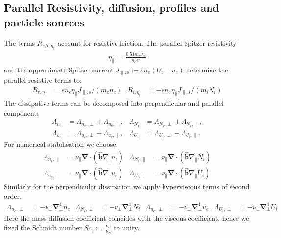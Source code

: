 \documentclass{hitec} %
\renewcommand{\vec}[1]{\boldsymbol{#1}}
\begin{document}
\subsection{Parallel Resistivity, diffusion, profiles and particle sources}\label{sec:dissres}
The terms $R_{e/i,\eta_\parallel}$ account for resistive friction.
The parallel Spitzer resistivity
\begin{align}
\eta_\parallel := \frac{0.51 m_e \nu_{ei}}{n_e e^2}
\end{align}
and the approximate Spitzer current \(J_{\parallel,s}:= e n_e \left(U_i - u_e\right)\) determine the parallel resistive terms to:
\begin{align}
  R_{e,\eta_\parallel} &=  en_e\eta_\parallel J_{\parallel,s}/(m_en_e)  &
  R_{i,\eta_\parallel} &=- en_e\eta_\parallel J_{\parallel,s}/(m_iN_i)
\end{align}
The dissipative terms can be decomposed into perpendicular and parallel components
\begin{align}
 \Lambda_{n_e} &= \Lambda_{n_e,\perp}+\Lambda_{n_e,\parallel}, &
 \Lambda_{N_i} &= \Lambda_{N_i,\perp}+\Lambda_{N_i,\parallel},\\
 \Lambda_{u_e} &= \Lambda_{u_e,\perp}+\Lambda_{u_e,\parallel},&
 \Lambda_{U_i} &= \Lambda_{U_i,\perp}+\Lambda_{U_i,\parallel}.
\end{align}
For numerical stabilisation we choose:
\begin{align}
\Lambda_{n_e,\parallel} &=  \nu_\parallel\vec{\nabla} \cdot \left(\vec{\hat{b}} \nabla_\parallel n_e\right) &
 \Lambda_{N_i,\parallel} &=  \nu_\parallel\vec{\nabla} \cdot \left(\vec{\hat{b}} \nabla_\parallel N_i\right) \\
  \Lambda_{u_e,\parallel} &= \nu_\parallel \vec{\nabla} \cdot \left(\vec{\hat{b}} \nabla_\parallel u_e\right) &
 \Lambda_{U_i,\parallel} &= \nu_\parallel \vec{\nabla} \cdot \left(\vec{\hat{b}} \nabla_\parallel U_i\right) 
\end{align}
Similarly for the perpendicular dissipation we apply hyperviscous terms of second order.
\begin{align}\label{eq:perpdiffNT}
 \Lambda_{n_e,\perp} &=  -\nu_\perp \vec{\nabla}_\perp^4 n_e &
 \Lambda_{N_i,\perp} &=  -\nu_\perp \vec{\nabla}_\perp^4 N_i &
 \Lambda_{u_e,\perp} &=  -\nu_\perp \vec{\nabla}_\perp^4 u_e &
 \Lambda_{U_i,\perp} &=  -\nu_\perp \vec{\nabla}_\perp^4 U_i
\end{align}
Here the mass diffusion coefficient coincides with the viscous coefficient, hence we fixed the Schmidt number \(\mathit{Sc}_\parallel:= \frac{\nu_U}{\nu_N}\) to unity.
\end{document}

